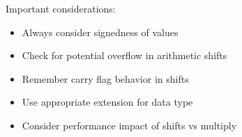 \begin{remark}
Important considerations:
\begin{itemize}
  \item Always consider signedness of values
  \item Check for potential overflow in arithmetic shifts
  \item Remember carry flag behavior in shifts
  \item Use appropriate extension for data type
  \item Consider performance impact of shifts vs multiply
\end{itemize}
\end{remark}